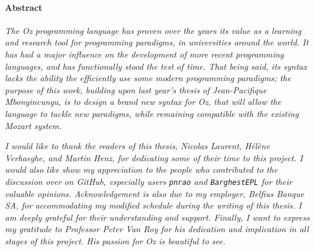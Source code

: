 
\paragraph{Abstract}
\textit{
The \textit{Oz} programming language has proven over the years its value as a learning and research tool for programming paradigms, in universities around the world.
It has had a major influence on the development of more recent programming languages, and has functionally stood the test of time.
That being said, its syntax lacks the ability the efficiently use some modern programming paradigms;
the purpose of this work, building upon last year's thesis of Jean-Pacifique Mbonyincungu, is to design a brand new syntax for \textit{Oz}, that will allow the language to tackle new paradigms, while remaining compatible with the existing Mozart system.
}\newline\newline

\textit{
I would like to thank the readers of this thesis, Nicolas Laurent, Hélène Verhaeghe, and Martin Henz, for dedicating some of their time to this project.\newline
I would also like show my appreciation to the people who contributed to the discussion over on \emph{GitHub}, especially users \texttt{pnrao} and \texttt{BarghestEPL} for their valuable opinions.\newline
Acknowledgement is also due to my employer, \emph{Belfius Banque SA}, for accommodating my modified schedule during the writing of this thesis. I am deeply grateful for their understanding and support.\newline
Finally, I want to express my gratitude to Professor Peter Van Roy for his dedication and implication in all stages of this project. His passion for \emph{Oz} is beautiful to see.
}